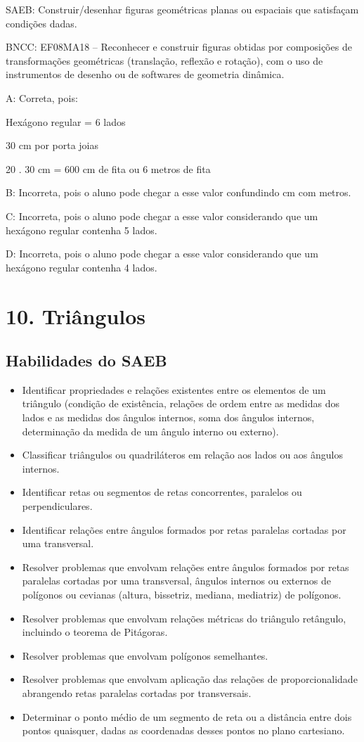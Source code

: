 {SAEB: Construir/desenhar figuras geométricas planas ou espaciais que
satisfaçam condições dadas.

BNCC: EF08MA18 -- Reconhecer e construir figuras obtidas por composições
de transformações geométricas (translação, reflexão e rotação), com o
uso de instrumentos de desenho ou de softwares de geometria dinâmica.

A: Correta, pois:

Hexágono regular = 6 lados

30 cm por porta joias

20 . 30 cm = 600 cm de fita ou 6 metros de fita

B: Incorreta, pois o aluno pode chegar a esse valor confundindo cm com
metros.

C: Incorreta, pois o aluno pode chegar a esse valor considerando que um
hexágono regular contenha 5 lados.

D: Incorreta, pois o aluno pode chegar a esse valor considerando que um
hexágono regular contenha 4 lados.


\chapter{10. Triângulos}

\section{Habilidades do SAEB}

\begin{itemize}
\item Identificar propriedades e relações existentes
entre os elementos de um triângulo (condição de existência, relações de
ordem entre as medidas dos lados e as medidas dos ângulos internos, soma
dos ângulos internos, determinação da medida de um ângulo interno ou
externo).
\item
  Classificar triângulos ou quadriláteros em relação aos lados ou aos
  ângulos internos.
\item
  Identificar retas ou segmentos de retas concorrentes, paralelos ou
  perpendiculares.
\item
  Identificar relações entre ângulos formados por retas paralelas
  cortadas por uma transversal.
\item
  Resolver problemas que envolvam relações entre ângulos formados por
  retas paralelas cortadas por uma transversal, ângulos internos ou
  externos de polígonos ou cevianas (altura, bissetriz, mediana,
  mediatriz) de polígonos.
\item
  Resolver problemas que envolvam relações métricas do triângulo
  retângulo, incluindo o teorema de Pitágoras.
\item
  Resolver problemas que envolvam polígonos semelhantes.
\item
  Resolver problemas que envolvam aplicação das relações de
  proporcionalidade abrangendo retas paralelas cortadas por
  transversais.
\item
  Determinar o ponto médio de um segmento de reta ou a distância entre
  dois pontos quaisquer, dadas as coordenadas desses pontos no plano
  cartesiano.
\end{itemize}

}
